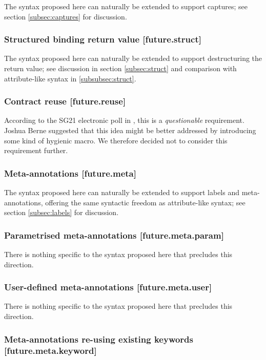 The syntax proposed here can naturally be extended to support captures; see section \ref{subsec:captures} for discussion.

\subsubsection{Structured binding return value  [future.struct]}

The syntax proposed here can naturally be extended to support destructuring the return value; see discussion in section \ref{subsec:struct} and comparison with attribute-like syntax in \ref{subsubsec:struct}.

\subsubsection{Contract reuse  [future.reuse]}

According to the SG21 electronic poll in \cite{P2885R2}, this is a \emph{questionable} requirement. Joshua Berne suggested that this idea might be better addressed by introducing some kind of hygienic macro. We therefore decided not to consider this requirement further.

\subsubsection{Meta-annotations  [future.meta]}

The syntax proposed here can naturally be extended to support labels and meta-annotations, offering the same syntactic freedom as attribute-like syntax; see section \ref{subsec:labels} for discussion.

\subsubsection{Parametrised meta-annotations  [future.meta.param]}

There is nothing specific to the syntax proposed here that precludes this direction.

\subsubsection{User-defined meta-annotations  [future.meta.user]}

There is nothing specific to the syntax proposed here that precludes this direction.

\subsubsection{Meta-annotations re-using existing keywords  [future.meta.keyword]}

